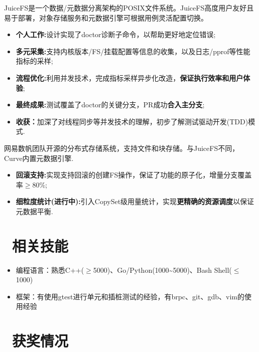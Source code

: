 \documentclass{resume}
\begin{document}
JuiceFS是一个数据/元数据分离架构的POSIX文件系统。JuiceFS高度用户友好且易于部署，对象存储服务和元数据引擎可根据用例灵活配置切换。
\begin{itemize}[parsep=0.3ex]
  \item \textbf{个人工作:}设计实现了doctor诊断子命令，以帮助更好地定位错误;
  \item \textbf{多元采集:}支持内核版本/FS/挂载配置等信息的收集，以及日志/pprof等性能指标的采样;
  \item \textbf{流程优化:}利用并发技术，完成指标采样异步化改造，\textbf{保证执行效率和用户体验};
  \item \textbf{最终成果:}测试覆盖了doctor的关键分支，PR成功\textbf{合入主分支};\enspace{}
  \item \textbf{收获：}加深了对线程同步等并发技术的理解，初步了解测试驱动开发(TDD)模式.
\end{itemize}
网易数帆团队开源的分布式存储系统，支持文件和块存储。与JuiceFS不同，Curve内置元数据引擎.
\begin{itemize}[parsep=0.3ex]
  \item \textbf{回滚支持:}实现支持回滚的创建FS操作，保证了功能的原子化，增量分支覆盖率$\geq$80\%;
  \item \textbf{细粒度统计(进行中):}引入CopySet级用量统计，实现\textbf{更精确的资源调度}以保证元数据平衡.
\end{itemize}
\section{\faCogs\ 相关技能}
\begin{itemize}[parsep=0.5ex]
  \item 编程语言：熟悉C++($\geq${5000})、Go/Python(1000\textasciitilde5000)、Bash Shell($\leq$1000)
  \item 框架：有使用gtest进行单元和插桩测试的经验，有brpc、git、gdb、vim的使用经验
\end{itemize}
\section{\faHeartO\ 获奖情况}
\end{document}
